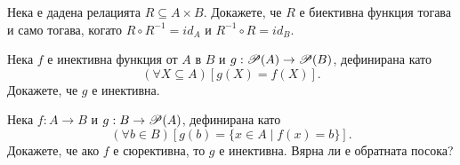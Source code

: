 

\begin{problem}
  Нека е дадена релацията $R\subseteq A\times B$.
  Докажете, че $R$ е биективна функция тогава и само тогава, когато $R\circ R^{-1} = id_A$ и $R^{-1}\circ R = id_B$.
\end{problem}

\begin{problem}
  Нека $f$ е инективна функция от $A$ в $B$ и $g:\mathscr{P}(A) \rightarrow \mathscr{P}(B)$, дефинирана като 
  \[(\forall X \subseteq A)[g(X) = f(X)].\]
  Докажете, че $g$ е инективна.
\end{problem}

\begin{problem}
  Нека $f:A\rightarrow B$ и $g:B\rightarrow\mathscr{P}(A)$, дефинирана като 
  \[(\forall b \in B)[g(b) = \{x\in A\mid f(x) = b\}].\]
  Докажете, че ако $f$ е сюрективна, то $g$ е инективна.
  Вярна ли е обратната посока?
\end{problem}


